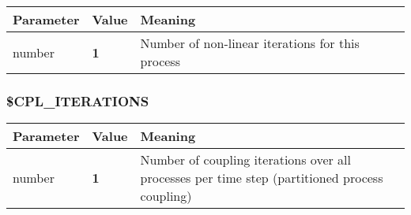 \begin{tabular*}{12.773cm}{|p{}|p{1.5cm}|p{7cm}|} \hline
Parameter          & Value & Meaning \\ \hline \hline
%
number & \bf 1 & Number of non-linear iterations for this process \\
\hline
\end{tabular*}

\subsubsection{\bf\$CPL\_ITERATIONS}

\begin{tabular*}{12.773cm}{|p{}|p{1.5cm}|p{7cm}|} \hline
Parameter          & Value & Meaning \\ \hline \hline
%
number & \bf 1 & Number of coupling iterations over all processes per time step (partitioned process coupling) \\
\hline
\end{tabular*}






